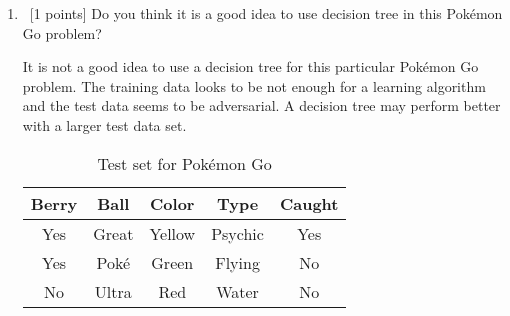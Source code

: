\begin{enumerate}
\begin{enumerate}
\item   ~[1 points]  Do you think it is a good idea to use decision tree in this Pok\'emon Go problem?

It is not a good idea to use a decision tree for this particular Pok\'emon Go problem. The training data looks to be not enough for a learning algorithm and the test data seems to be adversarial. A decision tree may perform better with a larger test data set.

\begin{table}[H]
\centering
\begin{tabular}{| c c c c | c |}
\hline
Berry& Ball & Color & Type & Caught\\
\hline
Yes & Great & Yellow & Psychic & Yes \\
Yes & Pok\'e & Green & Flying & No \\
No & Ultra & Red & Water & No \\
\hline
\end{tabular}
\caption{Test set for Pok\'emon Go}
\end{table}



\end{enumerate}
\end{enumerate}
